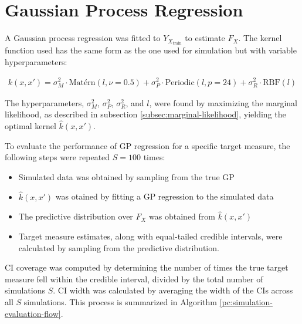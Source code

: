 \section{Gaussian Process Regression}\label{sec:evaluation-gaussian-process-regression}

A Gaussian process regression was fitted to $Y_{X_{\text{train}}}$ to estimate $F_X$.
The kernel function used has the same form as the one used for simulation
but with variable hyperparameters:

\begin{gather*}\label{def:gp_fit}
    k(x, x') = \sigma_M^2 \cdot \text{Matérn}(l, \nu=0.5) +
               \sigma_P^2 \cdot \text{Periodic}(l, p=24) +
               \sigma_R^2 \cdot \text{RBF}(l)
\end{gather*}

The hyperparameters, $\sigma_M^2$, $\sigma_P^2$, $\sigma_R^2$, and $l$, were found by
maximizing the marginal likelihood, as described in subsection
\ref{subsec:marginal-likelihood}, yielding the optimal kernel $\hat{k}(x, x')$.


To evaluate the performance of GP regression for a specific target measure,
the following steps were repeated $S=100$ times:
\begin{itemize}
    \item  Simulated data was obtained by sampling from the true GP
    \item  $\hat{k}(x, x')$ was otained by fitting a GP regression to the simulated data
    \item  The predictive distribution over $F_X$ was obtained from $\hat{k}(x, x')$
    \item  Target measure estimates, along with equal-tailed credible intervals, were calculated by sampling from the predictive distribution.
\end{itemize}
CI coverage was computed by determining the number of times the true target measure fell within the credible interval,
divided by the total number of simulations $S$.
CI width was calculated by averaging the width of the CIs across all $S$ simulations.
This process is summarized in Algorithm \ref{pc:simulation-evaluation-flow}.



